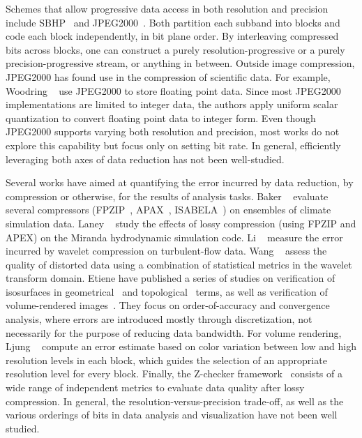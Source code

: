 Schemes that allow progressive data access in both resolution and precision include
SBHP~\cite{sbhp2000} and JPEG2000~\cite{jpeg2000}. Both partition each subband into blocks and code
each block independently, in bit plane order. By interleaving compressed bits across blocks, one can
construct a purely resolution-progressive or a purely precision-progressive stream, or anything in
between. Outside image compression, JPEG2000 has found use in the compression of scientific data.
For example, Woodring \etal~\cite{woodring2011} use JPEG2000 to store floating point data. Since
most JPEG2000 implementations are limited to integer data, the authors apply uniform scalar
quantization to convert floating point data to integer form. Even though JPEG2000 supports varying
both resolution and precision, most works do not explore this capability but focus only on setting
bit rate. In general, efficiently leveraging both axes of data reduction has not been well-studied.

Several works have aimed at quantifying the error incurred by data reduction, by compression or
otherwise, for the results of analysis tasks. Baker \etal~\cite{evaluating-compression-climate}
evaluate several compressors (FPZIP~\cite{fpzip}, APAX~\cite{apax}, ISABELA~\cite{isabela}) on
ensembles of climate simulation data. Laney \etal~\cite{compression_sim2013} study the effects of
lossy compression (using FPZIP and APEX) on the Miranda hydrodynamic simulation code. Li
\etal~\cite{evaluating-efficacy-wavelet} measure the error incurred by wavelet compression on
turbulent-flow data. Wang \etal~\cite{statistical-volume-quality} assess the quality of distorted
data using a combination of statistical metrics in the wavelet transform domain. Etiene \etal have
published a series of studies on verification of isosurfaces in
geometrical~\cite{verifiable-isosurface} and topological~\cite{topology-verification-isosurface}
terms, as well as verification of volume-rendered images~\cite{verifying-volume-rendering}. They
focus on order-of-accuracy and convergence analysis, where errors are introduced mostly through
discretization, not necessarily for the purpose of reducing data bandwidth. {\color{purple}For
volume rendering, Ljung \etal~\cite{transfer-function-based} compute an error estimate based on
color variation between low and high resolution levels in each block, which guides the selection of
an appropriate resolution level for every block.} Finally, the Z-checker framework~\cite{z-checker}
consists of a wide range of independent metrics to evaluate data quality after lossy compression. In
general, the resolution-versus-precision trade-off, as well as the various orderings of bits in data
analysis and visualization have not been well studied.

